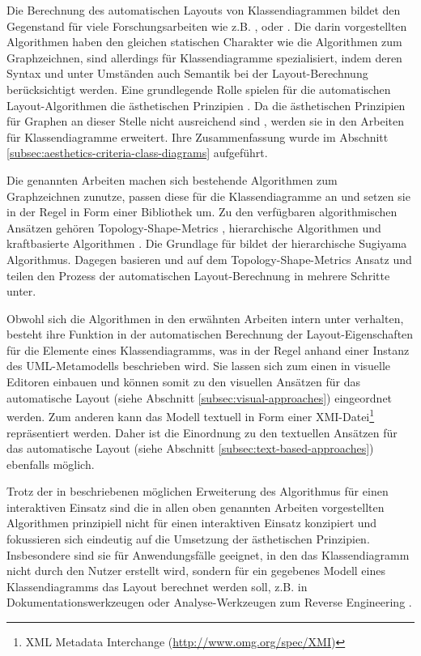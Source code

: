 Die Berechnung des automatischen Layouts von Klassendiagrammen bildet den Gegenstand für viele Forschungsarbeiten wie z.B. \cite{Eichelberger05Aesthetics}, \cite{Siebenhaller03Automatisches} oder \cite{Eiglsperger04Automatic}. Die darin vorgestellten Algorithmen haben den gleichen statischen Charakter wie die Algorithmen zum Graphzeichnen, sind allerdings für Klassendiagramme spezialisiert, indem deren Syntax und unter Umständen auch Semantik bei der Layout-Berechnung berücksichtigt werden. Eine grundlegende Rolle spielen für die automatischen Layout-Algorithmen die ästhetischen Prinzipien \cite{Maier12A-Pattern-based}. Da die ästhetischen Prinzipien für Graphen an dieser Stelle nicht ausreichend sind \cite[S.79]{Eichelberger05Aesthetics}, werden sie in den Arbeiten für Klassendiagramme erweitert. Ihre Zusammenfassung wurde im Abschnitt \ref{subsec:aesthetics-criteria-class-diagrams} aufgeführt.

Die genannten Arbeiten machen sich bestehende Algorithmen zum Graphzeichnen zunutze, passen diese für die Klassendiagramme an und setzen sie in der Regel in Form einer Bibliothek um. Zu den verfügbaren algorithmischen Ansätzen gehören Topology-Shape-Metrics \cite[S.33]{Siebenhaller03Automatisches}, hierarchische Algorithmen und kraftbasierte Algorithmen \cite[S.32ff]{Eichelberger05Aesthetics}. Die Grundlage für \cite{Eichelberger05Aesthetics} bildet der hierarchische Sugiyama Algorithmus. Dagegen basieren \cite{Siebenhaller03Automatisches} und \cite{Eiglsperger04Automatic} auf dem Topology-Shape-Metrics Ansatz und teilen den Prozess der automatischen Layout-Berechnung in mehrere Schritte unter.

Obwohl sich die Algorithmen in den erwähnten Arbeiten intern unter verhalten, besteht ihre Funktion in der automatischen Berechnung der Layout-Eigenschaften für die Elemente eines Klassendiagramms, was in der Regel anhand einer Instanz des UML-Metamodells beschrieben wird. Sie lassen sich zum einen in visuelle Editoren einbauen und können somit zu den visuellen Ansätzen für das automatische Layout (siehe Abschnitt \ref{subsec:visual-approaches}) eingeordnet werden. Zum anderen kann das Modell textuell in Form einer XMI-Datei\footnote{XML Metadata Interchange (\url{http://www.omg.org/spec/XMI})} repräsentiert werden. Daher ist die Einordnung zu den textuellen Ansätzen für das automatische Layout (siehe Abschnitt \ref{subsec:text-based-approaches}) ebenfalls möglich.

Trotz der in \cite{Eiglsperger04Automatic} beschriebenen möglichen Erweiterung des Algorithmus für einen interaktiven Einsatz sind die in allen oben genannten Arbeiten vorgestellten Algorithmen prinzipiell nicht für einen interaktiven Einsatz konzipiert und fokussieren sich eindeutig auf die Umsetzung der ästhetischen Prinzipien. Insbesondere sind sie für Anwendungsfälle geeignet, in den das Klassendiagramm nicht durch den Nutzer erstellt wird, sondern für ein gegebenes Modell eines Klassendiagramms das Layout berechnet werden soll, z.B. in Dokumentationswerkzeugen oder Analyse-Werkzeugen zum Reverse Engineering \cite{Eiglsperger04Automatic}.

